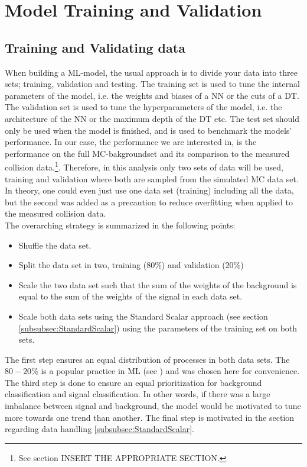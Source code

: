 \section{Model Training and Validation}
\subsection{Training and Validating data}\label{subsec:TraVal}
When building a \ac{ML}-model, the usual approach is to divide your data into three sets; training, validation and 
testing. The training set is used to tune the internal parameters of the model, i.e. the weights and biases of a \ac{NN} or the cuts of a \ac{DT}.
The validation set is used to tune the hyperparameters of the model, i.e. the architecture of the \ac{NN} or the maximum depth of the \ac{DT} etc.
The test set should only be used when the model is finished, and is used to benchmark the models' performance. In our case, the performance we are 
interested in, is the performance on the full \ac{MC}-bakgroundset and its comparison to the measured collision data.\footnote{See section INSERT 
THE APPROPRIATE SECTION.}. Therefore, in this analysis only two sets of data will be used, training and validation where both are sampled from the simulated
\ac{MC} data set. In theory, one could even just use one data set (training) including all the data, but the second was added as a precaution to reduce 
overfitting when applied to the measured collision data.
\\
The overarching strategy is summarized in the following points:
\begin{itemize}
    \item Shuffle the data set. 
    \item Split the data set in two, training ($80\%$) and validation ($20\%$)
    \item Scale the two data set such that the sum of the weights of the background is equal to the sum of the weights of the signal in each data set.
    \item Scale both data sets using the Standard Scalar approach (see section \ref{subsubsec:StandardScalar}) using the parameters of the training set 
          on both sets.
\end{itemize}
The first step ensures an equal distribution of processes in both data sets. The $80-20\%$ is a popular practice in \ac{ML} (see \cite{8020}) and was chosen 
here for convenience. The third step is done to ensure an equal prioritization for background classification and signal classification. In other words, if there 
was a large imbalance between signal and background, the model would be motivated to tune more towards one trend than another. The final step is motivated in the
section regarding data handling \ref{subsubsec:StandardScalar}. 

